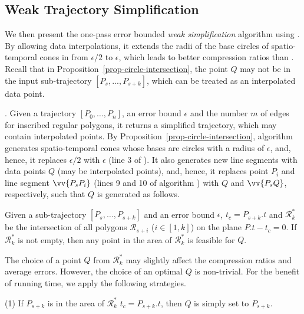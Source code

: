 \subsection{Weak Trajectory Simplification}

We then present the one-pass error bounded {\em weak simplification} algorithm using \sed.
By allowing data interpolations, it extends the radii of the base circles of spatio-temporal cones in \cist from $\epsilon/2$ to $\epsilon$, which leads to better compression ratios than \cist.
Recall that in Proposition~\ref{prop-circle-intersection}, the point $Q$ may not be in the input sub-trajectory $[P_s,...,P_{s+k}]$, which can be treated as an interpolated data point.




.
Given a trajectory ${[P_0,\ldots, P_n]}$, an error bound $\epsilon$ and the number $m$ of edges for inscribed regular polygons, it returns a simplified trajectory, which may contain interpolated points.
%
By Proposition~\ref{prop-circle-intersection}, algorithm \cista generates spatio-temporal cones whose bases are circles with a radius of $\epsilon$,
and, hence, it replaces $\epsilon/2$ with $\epsilon$ (line 3 of \cist).
It also generates new line segments with data points $Q$ (may be interpolated points), and,
hence, it replaces point $P_i$ and line segment $\vv{P_sP_i}$  (lines 9 and 10 of algorithm \cist) with $Q$ and $\vv{P_sQ}$, respectively,  such that $Q$ is generated as follows.


\begin{prop}
\label{prop-cist-Q}
Given a sub-trajectory ${[P_s, \ldots, P_{s+k}]}$ and an error bound $\epsilon$,  $t_c=P_{s+k}.t$ and $\mathcal{R}^*_k$ be the intersection of all polygons $\mathcal{R}_{s+i}$ ($i\in[1,k]$) on the plane $P.t - t_c = 0$. If $\mathcal{R}^*_k$ is not empty, then any point in the area of $\mathcal{R}^*_k$ is feasible for $Q$.
\end{prop}

The choice of a point $Q$ from $\mathcal{R}^*_k$ may slightly affect the compression ratios and average errors. However, the choice of an optimal $Q$ is non-trivial. For the benefit of running time, we apply the following strategies.

\sstab (1) If $P_{s+k}$ is in the area of $\mathcal{R}^*_k$ \wrt $t_c=P_{s+k}.t$, then $Q$ is simply set to $P_{s+k}$.

